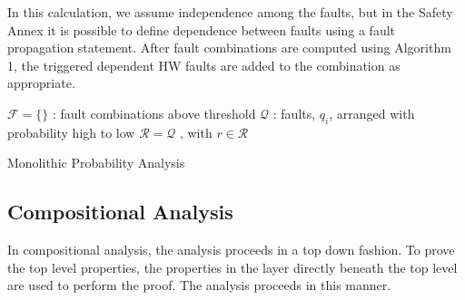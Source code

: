 In this calculation, we assume independence among the faults, but in the Safety Annex it is possible to define dependence between faults using a %
fault propagation statement. After fault combinations are computed using Algorithm 1, the triggered dependent HW faults are added to the combination as appropriate. 

\begin{algorithm}[H]
	$\mathcal{F} = \{\}$ : fault combinations above threshold \;
	$\mathcal{Q}$ : faults, $q_i$, arranged with probability high to low \;
	$\mathcal{R} = \mathcal{Q}$ , with $r \in \mathcal{R}$\;
	\caption{Monolithic Probability Analysis}
\end{algorithm}




\subsection{Compositional Analysis}
In compositional analysis, the analysis proceeds in a top down fashion. To prove the top level properties, the properties in the layer directly beneath the top level are used to perform the proof. The analysis proceeds in this manner.

